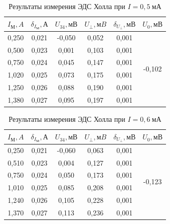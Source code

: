\documentclass[a4paper, 12pt]{article}
\begin{document}
\begin{table}[h!]
\begin{center}
\begin{tabular}{|c|c|c|c|c|c|}
\hline
$I_М, A$  & $\delta_{I_М}, А$ & $U_{34}, мВ$ & $U_{\perp}, мB$ & $\delta_{U_{\perp}}, мВ$ & $U_0, мВ$                     \\ \hline
0,250 & 0,021 & -0,050  & 0,052    & 0,001  & \multirow{6}{*}{-0,102} \\ \cline{1-5}
0,500 & 0,023 & 0,001   & 0,103    & 0,001  &                         \\ \cline{1-5}
0,750 & 0,024 & 0,045   & 0,147    & 0,001  &                         \\ \cline{1-5}
1,020 & 0,025 & 0,073   & 0,175    & 0,001  &                         \\ \cline{1-5}
1,250 & 0,026 & 0,088   & 0,190    & 0,001  &                         \\ \cline{1-5}
1,380 & 0,027 & 0,095   & 0,197    & 0,001  &                         \\ \hline
\end{tabular}
\end{center}
\caption{Результаты измерения ЭДС Холла при $I = 0,5~мА$}
\label{tab4}
\end{table}

\begin{table}[h!]
\begin{center}
\begin{tabular}{|c|c|c|c|c|c|}
\hline
$I_М, A$  & $\delta_{I_М}, А$ & $U_{34}, мВ$ & $U_{\perp}, мB$ & $\delta_{U_{\perp}}, мВ$ & $U_0, мВ$                     \\ \hline
0,250 & 0,021 & -0,060  & 0,063    & 0,001  & \multirow{6}{*}{-0,123} \\ \cline{1-5}
0,510 & 0,023 & 0,004   & 0,127    & 0,001  &                         \\ \cline{1-5}
0,750 & 0,024 & 0,050   & 0,173    & 0,001  &                         \\ \cline{1-5}
1,010 & 0,025 & 0,085   & 0,208    & 0,001  &                         \\ \cline{1-5}
1,240 & 0,026 & 0,105   & 0,228    & 0,001  &                         \\ \cline{1-5}
1,370 & 0,027 & 0,113   & 0,236    & 0,001  &                         \\ \hline
\end{tabular}
\end{center}
\caption{Результаты измерения ЭДС Холла при $I = 0,6~мА$}
\label{tab5}
\end{table}
\end{document}
